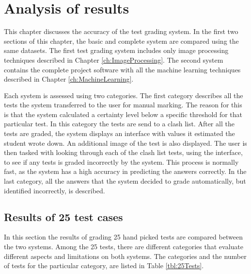 \chapter{Analysis of results}
\label{ch:Results}
\ifpdf
\graphicspath{{Chapter5/Chapter5Figures/}}
\fi

This chapter discusses the accuracy of the test grading system. In the first two sections of this chapter, the basic and complete system are compared using the same datasets. The first test grading system includes only image processing techniques described in Chapter \ref{ch:ImageProcessing}. The second system contains the complete project software with all the machine learning techniques described in Chapter \ref{ch:MachineLearning}.

Each system is assessed using two categories. The first category describes all the tests the system transferred to the user for manual marking. The reason for this is that the system calculated a certainty level below a specific threshold for that particular test. In this category the tests are send to a clash list. After all the tests are graded, the system displays an interface with values it estimated the student wrote down. An additional image of the test is also displayed. The user is then tasked with looking through each of the clash list tests, using the interface, to see if any tests is graded incorrectly by the system. This process is normally fast, as the system has a high accuracy in predicting the answers correctly. In the last category, all the answers that the system decided to grade automatically, but identified incorrectly, is described.

\section{Results of 25 test cases}

In this section the results of grading 25 hand picked tests are compared between the two systems. Among the 25 tests, there are different categories that evaluate different aspects and limitations on both systems. The categories and the number of tests for the particular category, are listed in Table \ref{tbl:25Tests}.

